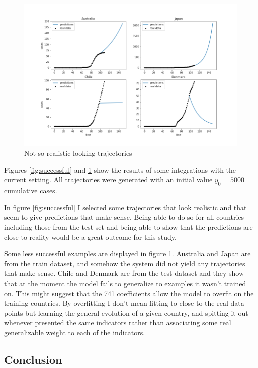 \documentclass[12pt, a4]{article}
\begin{document}
\begin{figure}[!]
  \includegraphics[width=\linewidth]{unsuccessful.png}
  \caption{Not so realistic-looking trajectories}
  \label{fig:unsuccessful}
\end{figure}

Figures \ref{fig:successful} and \ref{fig:unsuccessful} show the results of some integrations with the current setting.
All trajectories were generated with an initial value $y_0 = 5000$ cumulative cases.

In figure \ref{fig:successful} I selected some trajectories that look realistic and that seem to give predictions that make sense.
Being able to do so for all countries including those from the test set and being able to show that the predictions are close to reality would be a great outcome for this study.


Some less successful examples are displayed in figure \ref{fig:unsuccessful}. 
Australia and Japan are from the train dataset, and somehow the system did not yield any trajectories that make sense. 
Chile and Denmark are from the test dataset and they show that at the moment the model fails to generalize to examples it wasn't trained on. 
This might suggest that the 741 coefficients allow the model to overfit on the training countries. 
By overfitting I don't mean fitting to close to the real data points but learning the general evolution of a given country, and spitting it out whenever presented the same indicators rather than associating some real generalizable weight to each of the indicators.

\subsection*{Conclusion}
\end{document}
